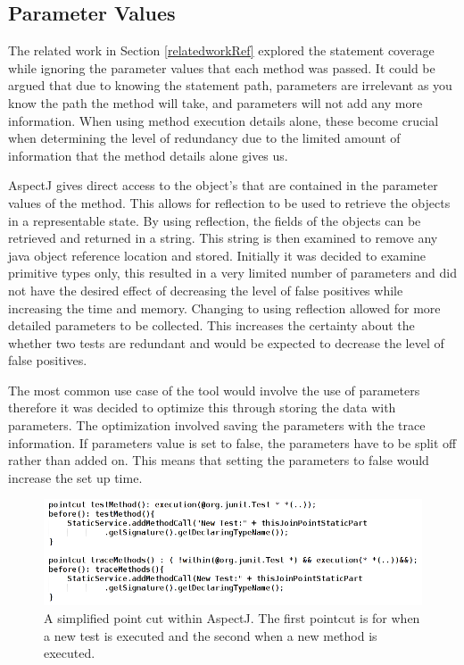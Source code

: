\subsection{Parameter Values}
The related work in Section \ref{relatedworkRef} explored the statement coverage while ignoring the parameter values that each method was passed. It could be argued that due to knowing the statement path, parameters are irrelevant as you know the path the method will take, and parameters will not add any more information. When using method execution details alone, these become crucial when determining the level of redundancy due to the limited amount of information that the method details alone gives us. 

AspectJ gives direct access to the object's that are contained in the parameter values of the method. This allows for reflection to be used to retrieve the objects in a representable state. By using reflection, the fields of the objects can be retrieved and returned in a string. This string is then examined to remove any java object reference location and stored. Initially it was decided to examine primitive types only, this resulted in a very limited number of parameters and did not have the desired effect of decreasing the level of false positives while increasing the time and memory. Changing to using reflection allowed for more detailed parameters to be collected. This increases the certainty about the whether two tests are redundant and would be expected to decrease the level of false positives.

The most common use case of the tool would involve the use of parameters therefore it was decided to optimize this through storing the data with parameters. The optimization involved saving the parameters with the trace information. If parameters value is set to false, the parameters have to be split off rather than added on. This means that setting the parameters to false would increase the set up time.

\begin{figure}[h]
\begin{center}
\includegraphics[width = \textwidth]{aspect.png}
\end{center}
\caption{A simplified point cut within AspectJ. The first pointcut is for when a new test is executed and the second when a new method is executed.}
\label{fig:aspectused}
\end{figure}

